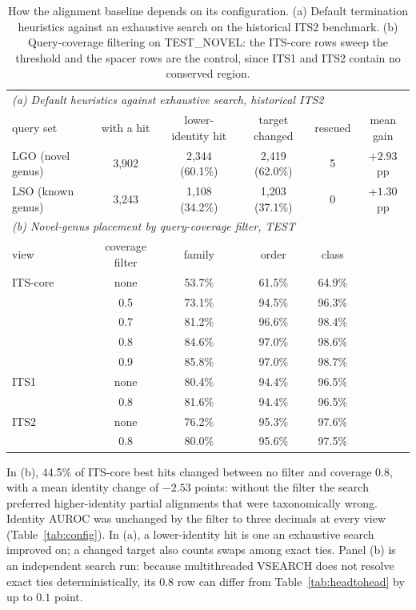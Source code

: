 \begin{table}[htbp]\centering
\begin{threeparttable}
\caption{How the alignment baseline depends on its configuration. (a) Default termination heuristics against an exhaustive search on the historical ITS2 benchmark. (b) Query-coverage filtering on TEST\_NOVEL: the ITS-core rows sweep the threshold and the spacer rows are the control, since ITS1 and ITS2 contain no conserved region.}
\label{tab:baseline}
\footnotesize
\setlength{\tabcolsep}{4pt}
\begin{tabular}{lccccc}
\toprule
\multicolumn{6}{l}{\emph{(a) Default heuristics against exhaustive search, historical ITS2}} \\
query set & with a hit & lower-identity hit & target changed & rescued & mean gain \\
\midrule
LGO (novel genus) & 3,902 & 2,344 (60.1\%) & 2,419 (62.0\%) & 5 & $+2.93$ pp \\
LSO (known genus) & 3,243 & 1,108 (34.2\%) & 1,203 (37.1\%) & 0 & $+1.30$ pp \\
\midrule
\multicolumn{6}{l}{\emph{(b) Novel-genus placement by query-coverage filter, TEST}} \\
view & coverage filter & family & order & class & \\
\midrule
ITS-core & none & 53.7\% & 61.5\% & 64.9\% & \\
 & 0.5 & 73.1\% & 94.5\% & 96.3\% & \\
 & 0.7 & 81.2\% & 96.6\% & 98.4\% & \\
 & 0.8 & 84.6\% & 97.0\% & 98.6\% & \\
 & 0.9 & 85.8\% & 97.0\% & 98.7\% & \\
\addlinespace
ITS1 & none & 80.4\% & 94.4\% & 96.5\% & \\
 & 0.8 & 81.6\% & 94.4\% & 96.5\% & \\
\addlinespace
ITS2 & none & 76.2\% & 95.3\% & 97.6\% & \\
 & 0.8 & 80.0\% & 95.6\% & 97.5\% & \\
\bottomrule
\end{tabular}
\begin{tablenotes}\footnotesize
\item In (b), 44.5\% of ITS-core best hits changed between no filter and coverage $0.8$, with a mean identity change of $-2.53$ points: without the filter the search preferred higher-identity partial alignments that were taxonomically wrong. Identity AUROC was unchanged by the filter to three decimals at every view (Table~\ref{tab:config}). In (a), a lower-identity hit is one an exhaustive search improved on; a changed target also counts swaps among exact ties. Panel (b) is an independent search run: because multithreaded VSEARCH does not resolve exact ties deterministically, its $0.8$ row can differ from Table~\ref{tab:headtohead} by up to $0.1$ point.
\end{tablenotes}
\end{threeparttable}
\end{table}
